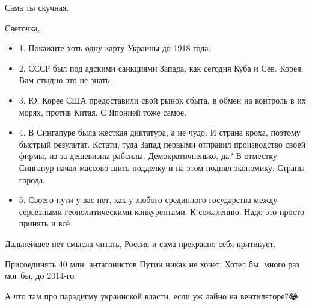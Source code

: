 \begin{itemize}
 
Сама ты скучная.

 
Светочка,

\begin{itemize}
\item 1. Покажите хоть одну карту Украины до 1918 года.

\item 2. СССР был под адскими санкциями Запада, как сегодня Куба и Сев. Корея.
				Вам стыдно это не знать.

\item 3. Ю. Корее США предоставили свой рынок сбыта, в обмен на контроль в их
				морях, против Китая. С Японией тоже самое.

\item 4. В Сингапуре была жесткая диктатура, а не чудо. И страна кроха, поэтому
				быстрый результат. Кстати, туда Запад первыми отправил производство
								своей фирмы, из-за дешевизны рабсилы. Демократичненько, да? В
								отместку Сингапур начал массово шить подделку и на этом поднял
								экономику. Страны-города.

\item 5. Своего пути у вас нет, как у любого срединного государства между
				серьезными геополитическими конкурентами. К сожалению. Надо это просто
								принять и всё
\end{itemize}

Дальнейшее нет смысла читать, Россия и сама прекрасно себя критикует.

Присоединять 40 млн. антагонистов Путин никак не хочет. Хотел бы, много раз мог
бы, до 2014-го

 
А что там про парадигму украинской власти, если уж лайно на вентиляторе?😂

 

\end{itemize}
